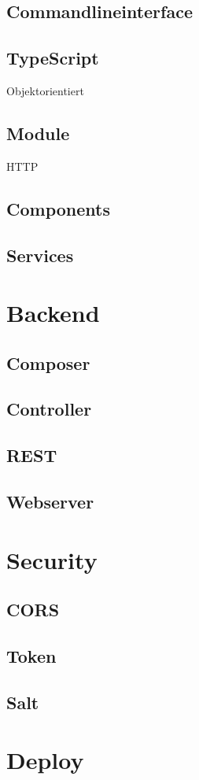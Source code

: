 \subsection{Commandlineinterface}

\subsection{TypeScript}
Objektorientiert

\subsection{Module}
HTTP

\subsection{Components}

\subsection{Services}





\section{Backend}

\subsection{Composer}

\subsection{Controller}

\subsection{REST}

\subsection{Webserver}


\section{Security}

\subsection{CORS}

\subsection{Token}

\subsection{Salt}


\section{Deploy}
